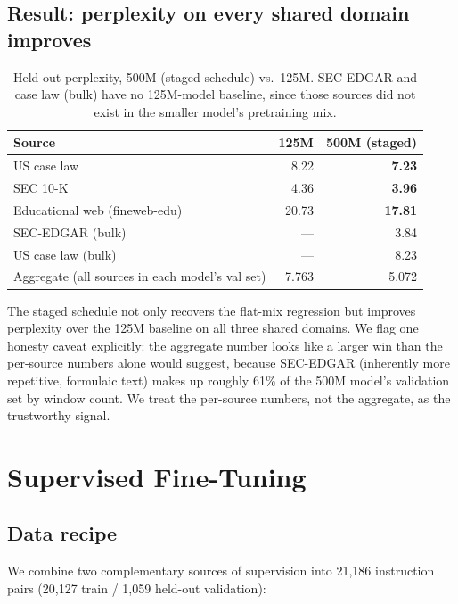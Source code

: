 \documentclass[11pt]{article}
\begin{document}
\subsection{Result: perplexity on every shared domain improves}

\begin{table}[h]
\centering
\caption{Held-out perplexity, 500M (staged schedule) vs.\ 125M.
SEC-EDGAR and case law (bulk) have no 125M-model baseline, since those
sources did not exist in the smaller model's pretraining mix.}
\label{tab:ppl}
\begin{tabular}{lrr}
\toprule
\textbf{Source} & \textbf{125M} & \textbf{500M (staged)} \\
\midrule
US case law & 8.22 & \textbf{7.23} \\
SEC 10-K & 4.36 & \textbf{3.96} \\
Educational web (fineweb-edu) & 20.73 & \textbf{17.81} \\
SEC-EDGAR (bulk) & --- & 3.84 \\
US case law (bulk) & --- & 8.23 \\
\midrule
Aggregate (all sources in each model's val set) & 7.763 & 5.072 \\
\bottomrule
\end{tabular}
\end{table}

The staged schedule not only recovers the flat-mix regression but improves
perplexity over the 125M baseline on all three shared domains. We flag one
honesty caveat explicitly: the aggregate number looks like a larger win
than the per-source numbers alone would suggest, because SEC-EDGAR
(inherently more repetitive, formulaic text) makes up roughly 61\% of the
500M model's validation set by window count. We treat the per-source
numbers, not the aggregate, as the trustworthy signal.

\section{Supervised Fine-Tuning}

\subsection{Data recipe}

We combine two complementary sources of supervision into 21{,}186
instruction pairs (20{,}127 train / 1{,}059 held-out validation):
\end{document}
